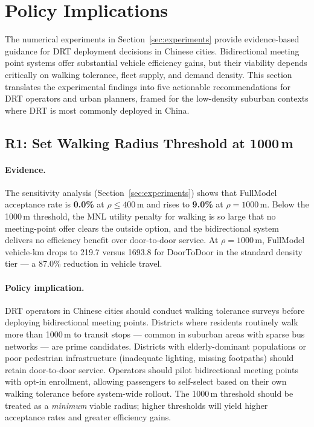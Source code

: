 
\section{Policy Implications}\label{sec:policy}

The numerical experiments in Section~\ref{sec:experiments} provide
evidence-based guidance for DRT deployment decisions in Chinese cities.
Bidirectional meeting point systems offer substantial vehicle efficiency
gains, but their viability depends critically on walking tolerance, fleet
supply, and demand density. This section translates the experimental
findings into five actionable recommendations for DRT operators and urban
planners, framed for the low-density suburban contexts where DRT is most
commonly deployed in China.

\subsection{R1: Set Walking Radius Threshold at 1000\,m}

\paragraph{Evidence.}
The sensitivity analysis (Section~\ref{sec:experiments}) shows that
FullModel acceptance rate is \textbf{0.0\%} at $\rho \leq 400$\,m and
rises to \textbf{9.0\%} at $\rho = 1000$\,m. Below the 1000\,m threshold,
the MNL utility penalty for walking is so large that no meeting-point offer
clears the outside option, and the bidirectional system delivers no
efficiency benefit over door-to-door service. At $\rho = 1000$\,m,
FullModel vehicle-km drops to 219.7 versus 1693.8 for DoorToDoor in the
standard density tier --- a 87.0\% reduction in vehicle travel.

\paragraph{Policy implication.}
DRT operators in Chinese cities should conduct walking tolerance surveys
before deploying bidirectional meeting points. Districts where residents
routinely walk more than 1000\,m to transit stops --- common in suburban
areas with sparse bus networks --- are prime candidates. Districts with
elderly-dominant populations or poor pedestrian infrastructure (inadequate
lighting, missing footpaths) should retain door-to-door service. Operators
should pilot bidirectional meeting points with opt-in enrollment, allowing
passengers to self-select based on their own walking tolerance before
system-wide rollout. The 1000\,m threshold should be treated as a
\emph{minimum} viable radius; higher thresholds will yield higher acceptance
rates and greater efficiency gains.

